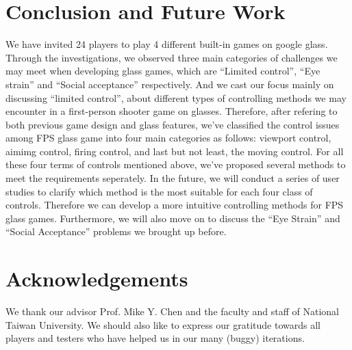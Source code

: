\documentclass{acm_proc_article-sp}
\begin{document}
\section{Conclusion and Future Work}
We have invited 24 players to play 4 different built-in games on google glass. Through the investigations, we observed three main categories of challenges we may meet when developing glass games, which are ``Limited control'', ``Eye strain'' and ``Social acceptance'' respectively. And we cast our focus mainly on discussing ``limited control'', about different types of controlling methods we may encounter in a first-person shooter game on glasses.
Therefore, after refering to both previous game design and glass features, we've classified the control issues among FPS glass game into four main categories as follows: viewport control, aimimg control, firing control, and last but not least, the moving control. For all these four terms of controls mentioned above, we've proposed several methods to meet the requirements seperately.
In the future, we will conduct a series of user studies to clarify which method is the most suitable for each four class of controls. Therefore we can develop a more intuitive controlling methods for FPS glass games. Furthermore, we will also move on to discuss the ``Eye Strain'' and ``Social Acceptance'' problems we brought up before.


\section{Acknowledgements}
We thank our advisor Prof. Mike Y. Chen and the faculty and staff of National Taiwan University. We should also like to express our gratitude towards all players and testers who have helped us in our many (buggy) iterations.

\balance



\end{document}
